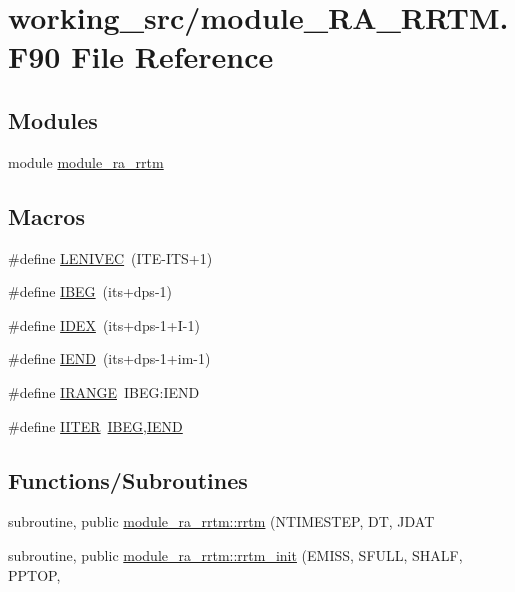 \hypertarget{module___r_a___r_r_t_m_8_f90}{}\section{working\+\_\+src/module\+\_\+\+R\+A\+\_\+\+R\+R\+TM.F90 File Reference}
\label{module___r_a___r_r_t_m_8_f90}
\subsection*{Modules}
\begin{DoxyCompactItemize}
\item 
module \hyperlink{namespacemodule__ra__rrtm}{module\+\_\+ra\+\_\+rrtm}
\end{DoxyCompactItemize}
\subsection*{Macros}
\begin{DoxyCompactItemize}
\item 
\#define \hyperlink{module___r_a___r_r_t_m_8_f90_a75ed08351dfa4fbb9c03252ed1426515}{L\+E\+N\+I\+V\+EC}~(I\+TE-\/I\+TS+1)
\item 
\#define \hyperlink{module___r_a___r_r_t_m_8_f90_a70d5ccc81e4a6b038582ce1c58dd7545}{I\+B\+EG}~(its+dps-\/1)
\item 
\#define \hyperlink{module___r_a___r_r_t_m_8_f90_ae744af53d51004c198a5d43fc2404310}{I\+D\+EX}~(its+dps-\/1+I-\/1)
\item 
\#define \hyperlink{module___r_a___r_r_t_m_8_f90_a2c90eada92b806206f8eae4c520f5d09}{I\+E\+ND}~(its+dps-\/1+im-\/1)
\item 
\#define \hyperlink{module___r_a___r_r_t_m_8_f90_a577a779752e5a3fc8c2476e579dcdd3b}{I\+R\+A\+N\+GE}~I\+B\+E\+G\+:\+I\+E\+ND
\item 
\#define \hyperlink{module___r_a___r_r_t_m_8_f90_ac9f9e31b6da0459d015dbc3fc612d890}{I\+I\+T\+ER}~\hyperlink{module___r_a___r_r_t_m_8_f90_a70d5ccc81e4a6b038582ce1c58dd7545}{I\+B\+EG},\hyperlink{module___r_a___r_r_t_m_8_f90_a2c90eada92b806206f8eae4c520f5d09}{I\+E\+ND}
\end{DoxyCompactItemize}
\subsection*{Functions/\+Subroutines}
\begin{DoxyCompactItemize}
\item 
subroutine, public \hyperlink{namespacemodule__ra__rrtm_a5f41dc60634a94eeedbf481b4f2b5fe3}{module\+\_\+ra\+\_\+rrtm\+::rrtm} (N\+T\+I\+M\+E\+S\+T\+EP, DT, J\+D\+AT                                                            
\item 
subroutine, public \hyperlink{namespacemodule__ra__rrtm_a22119bed7556f4dbe182eb523d4e6d94}{module\+\_\+ra\+\_\+rrtm\+::rrtm\+\_\+init} (E\+M\+I\+SS, S\+F\+U\+LL, S\+H\+A\+LF, P\+P\+T\+OP,                                      
\end{DoxyCompactItemize}


